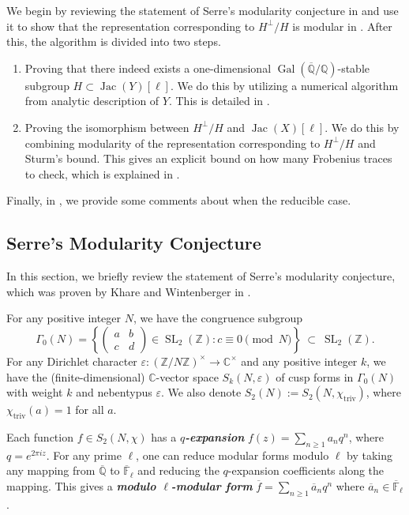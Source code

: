 \documentclass{amsproc}
\numberwithin{equation}{section}
\theoremstyle{definition}
\theoremstyle{remark}
\newcommand{\vocab}[1]{\textbf{\textit{\boldmath #1}}}
\DeclareMathOperator{\Jac}{Jac}
\DeclareMathOperator{\SL}{SL}
\DeclareMathOperator{\Gal}{Gal}
\newcommand{\eps}{\varepsilon}
\newcommand{\ZZ}{\mathbb Z}
\newcommand{\QQ}{\mathbb Q}
\newcommand{\CC}{\mathbb C}
\newcommand{\FF}{\mathbb F}
\newcommand{\Qbar}{\overline{\QQ}}
\newcommand{\GalQ}{\Gal(\Qbar/\QQ)}
\newcommand{\ttwomatrix}[4]{\left(\begin{smallmatrix} #1 & #2 \\ #3 & #4\end{smallmatrix}\right)}
\begin{document}
We begin by reviewing the statement of Serre's modularity conjecture in  and use it to show that the representation corresponding to $H^\perp/H$ is modular in .
After this, the algorithm is divided into two steps.
\begin{enumerate}
    \item Proving that there indeed exists a one-dimensional  $\GalQ$-stable subgroup $H\subset \Jac(Y)[\ell]$. We do this by utilizing a numerical algorithm from analytic description of $Y$. This is detailed in .
    \item Proving the isomorphism between $H^\perp/H$ and $\Jac(X)[\ell]$. We do this by combining modularity of the representation corresponding to $H^\perp/H$ and Sturm's bound.
    This gives an explicit bound on how many Frobenius traces to check, which is explained in .
\end{enumerate}
Finally, in , we provide some comments about when the reducible case.

\subsection{Serre's Modularity Conjecture}
\label{subsec:serre_conjecture}
In this section, we briefly review the statement of Serre's modularity conjecture, which was proven by Khare and Wintenberger in \cite{modularity}.

For any positive integer $N$, we have the congruence subgroup
\begin{equation}
    \Gamma_0(N) = \left\{\ttwomatrix abcd \in \SL_2(\ZZ): c\equiv 0\pmod N\right\}\ \subset\ \SL_2(\ZZ).
\end{equation}
For any Dirichlet character $\eps : (\ZZ/N\ZZ)^\times \to \CC^\times$ and any positive integer $k$, we have the (finite-dimensional) $\CC$-vector space $S_k(N,\eps)$ of cusp forms in $\Gamma_0(N)$ with weight $k$ and nebentypus $\eps$.
We also denote $S_2(N) := S_2(N,\chi_{\text{triv}})$, where $\chi_{\text{triv}}(a)=1$ for all $a$.

Each function $f\in S_2(N,\chi)$ has a \vocab{$q$-expansion} $f(z) = \sum_{n\geq 1}a_nq^n$, where $q=e^{2\pi iz}$. 
For any prime $\ell$, one can reduce modular forms modulo $\ell$ by taking any mapping from $\Qbar$ to $\overline{\FF}_\ell$ and reducing the $q$-expansion coefficients along the mapping. This gives a \vocab{modulo $\ell$-modular form} $\overline f = \sum_{n\geq 1}\overline a_n q^n$ where $\overline a_n \in \overline{\FF}_\ell$. 
\end{document}

